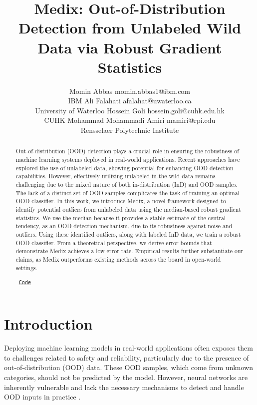 \documentclass[10pt]{article} %
\title{Medix: Out-of-Distribution Detection from Unlabeled Wild Data via Robust Gradient Statistics}
\author{\name Momin Abbas \email momin.abbas1@ibm.com \\
      \addr IBM
      \AND
      \name Ali Falahati \email afalahat@uwaterloo.ca \\
      \addr University of Waterloo  
      \AND
      \name Hossein Goli \email hossein.goli@cuhk.edu.hk \\
      \addr CUHK
      \AND
      \name Mohammad Mohammadi Amiri \email mamiri@rpi.edu\\
      \addr Rensselaer Polytechnic Institute}
\theoremstyle{plain}
\theoremstyle{definition}
\begin{document}
\maketitle

\begin{abstract}
Out-of-distribution (OOD) detection plays a crucial role in ensuring the robustness of machine learning systems deployed in real-world applications. 
Recent approaches have explored the use of unlabeled data, showing potential for enhancing OOD detection capabilities. However, effectively utilizing unlabeled in-the-wild data remains challenging due to the mixed nature of both in-distribution (InD) and OOD samples. The lack of a distinct set of OOD samples complicates the task of training an optimal OOD classifier. In this work, we introduce Medix, a novel framework designed to identify potential outliers from unlabeled data using the median-based robust gradient statistics. We use the median because it provides a stable estimate of the central tendency, as an OOD detection mechanism, due to its robustness against noise and outliers. Using these identified outliers, along with labeled InD data, we train a robust OOD classifier. From a theoretical perspective, we derive error bounds that demonstrate Medix achieves a low error rate. Empirical results further substantiate our claims, as Medix outperforms existing methods across the board in open-world settings.

\begin{center}
\noindent\faGithub\  \texttt{\href{https://github.com/mominabbass/Medix}{Code}}
\end{center}


\end{abstract}



\section{Introduction}
\label{sec::intro}
Deploying machine learning models in real-world applications often exposes them to challenges related to safety and reliability, particularly due to the presence of out-of-distribution (OOD) data. These OOD samples, which come from unknown categories, should not be predicted by the model. However, neural networks are inherently vulnerable and lack the necessary mechanisms to detect and handle OOD inputs in practice \citep{nguyen2015deep}.
\end{document}

